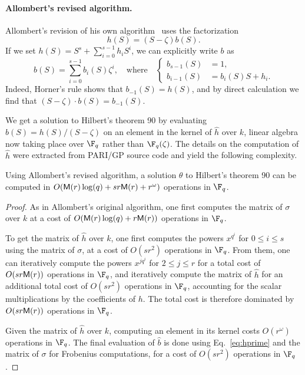 \paragraph{\bf Allombert's revised algorithm.}
Allombert's revision of his own algorithm~\cite{Allombert02-rev} uses
the factorization
\begin{equation}
  \label{eq:allomb-b}
  h(S)=(S-\zeta) b(S).
\end{equation}
If we set $h(S)=S^s+\sum_{i=0}^{s-1}h_iS^i$, we can
explicitly write $b$ as
\begin{equation}
  \label{eq:hprime}
  b(S)=\sum_{i=0}^{s-1}b_i(S)\zeta^i,\quad
  \text{where}\quad
  \left\{\begin{aligned}
    b_{s-1}(S) &= 1,\\
    b_{i-1}(S) &= b_i(S) S + h_i.
  \end{aligned}\right.
\end{equation}
Indeed, Horner's rule shows that $b_{-1}(S)=h(S)$, and by direct
calculation we find that $(S-\zeta)\cdot b(S) = b_{-1}(S)$.

We get a solution to Hilbert's theorem 90 by evaluating
$b(S)=h(S)/(S-\zeta)$ on an element in the kernel of $\hat{h}$ over
$k$, linear algebra now taking place over $\F_q$ rather than
$\F_q(\zeta)$. The details on the computation of $\hat{h}$ were
extracted from PARI/GP source code and yield the following complexity.

\begin{proposition}
  Using Allombert's revised algorithm, a solution $\theta$ to
  Hilbert's theorem 90 can be computed in $O(\mathsf{M}(r) \log(q) + s r
  \mathsf{M}(r) + r^\omega)$ operations in $\F_q$.
\end{proposition}

\begin{proof}
As in Allombert's original algorithm, one first
computes the matrix of $\sigma$ over $k$ at a cost of
$O(\mathsf{M}(r) \log(q) + r \mathsf{M}(r))$ operations in $\F_q$.


To get the matrix of $\hat{h}$ over $k$, one first computes the powers
$x^{q^i}$ for $0 \leq i \leq s$ using the matrix of $\sigma$, at a
cost of $O(s r^2)$ operations in $\F_q$.  From them, one can
iteratively compute the powers $x^{j q^i}$ for $2 \leq j \leq r$ for a
total cost of $O(s r \mathsf{M}(r))$ operations in $\F_q$, and iteratively
compute the matrix of $\hat{h}$ for an additional total cost of $O(s
r^2)$ operations in $\F_q$, accounting for the scalar multiplications
by the coefficients of $h$.  The total cost is therefore dominated by
$O(s r \mathsf{M}(r))$ operations in $\F_q$.

Given the matrix of $\hat{h}$ over $k$, computing an element in its
kernel costs $O(r^\omega)$ operations in $\F_q$.  The final evaluation
of $\hat{b}$ is done using Eq.~\eqref{eq:hprime} and the matrix of
$\sigma$ for Frobenius computations, for a cost of $O(s r^2)$ operations
in $\F_q$.
\end{proof}


